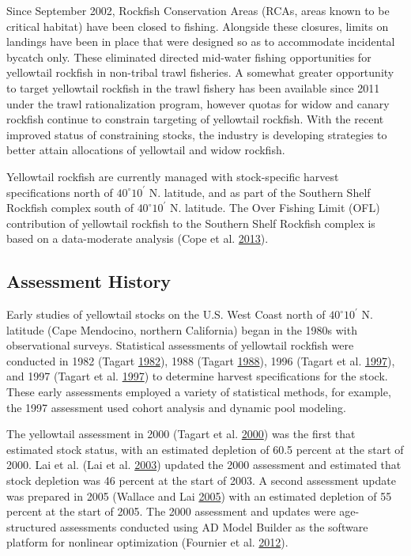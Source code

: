 \documentclass[12pt,]{article}
\begin{document}
Since September 2002, Rockfish Conservation Areas (RCAs, areas known to
be critical habitat) have been closed to fishing. Alongside these
closures, limits on landings have been in place that were designed so as
to accommodate incidental bycatch only. These eliminated directed
mid-water fishing opportunities for yellowtail rockfish in non-tribal
trawl fisheries. A somewhat greater opportunity to target yellowtail
rockfish in the trawl fishery has been available since 2011 under the
trawl rationalization program, however quotas for widow and canary
rockfish continue to constrain targeting of yellowtail rockfish. With
the recent improved status of constraining stocks, the industry is
developing strategies to better attain allocations of yellowtail and
widow rockfish.

Yellowtail rockfish are currently managed with stock-specific harvest
specifications north of \(40^\circ 10^\prime\) N. latitude, and as part
of the Southern Shelf Rockfish complex south of \(40^\circ 10^\prime\)
N. latitude. The Over Fishing Limit (OFL) contribution of yellowtail
rockfish to the Southern Shelf Rockfish complex is based on a
data-moderate analysis (Cope et al.
\protect\hyperlink{ref-Cope2013}{2013}).

\subsection{Assessment History}\label{assessment-history}

Early studies of yellowtail stocks on the U.S. West Coast north of
\(40^\circ 10^\prime\) N. latitude (Cape Mendocino, northern California)
began in the 1980s with observational surveys. Statistical assessments
of yellowtail rockfish were conducted in 1982 (Tagart
\protect\hyperlink{ref-Tagart1982}{1982}), 1988 (Tagart
\protect\hyperlink{ref-Tagart1988}{1988}), 1996 (Tagart et al.
\protect\hyperlink{ref-Tagart1997}{1997}), and 1997 (Tagart et al.
\protect\hyperlink{ref-Tagart1997}{1997}) to determine harvest
specifications for the stock. These early assessments employed a variety
of statistical methods, for example, the 1997 assessment used cohort
analysis and dynamic pool modeling.

The yellowtail assessment in 2000 (Tagart et al.
\protect\hyperlink{ref-Tagart2000}{2000}) was the first that estimated
stock status, with an estimated depletion of 60.5 percent at the start
of 2000. Lai et al. (Lai et al. \protect\hyperlink{ref-Lai2003}{2003})
updated the 2000 assessment and estimated that stock depletion was 46
percent at the start of 2003. A second assessment update was prepared in
2005 (Wallace and Lai \protect\hyperlink{ref-Wallace2005}{2005}) with an
estimated depletion of 55 percent at the start of 2005. The 2000
assessment and updates were age-structured assessments conducted using
AD Model Builder as the software platform for nonlinear optimization
(Fournier et al. \protect\hyperlink{ref-Fournier2012}{2012}).
\end{document}

